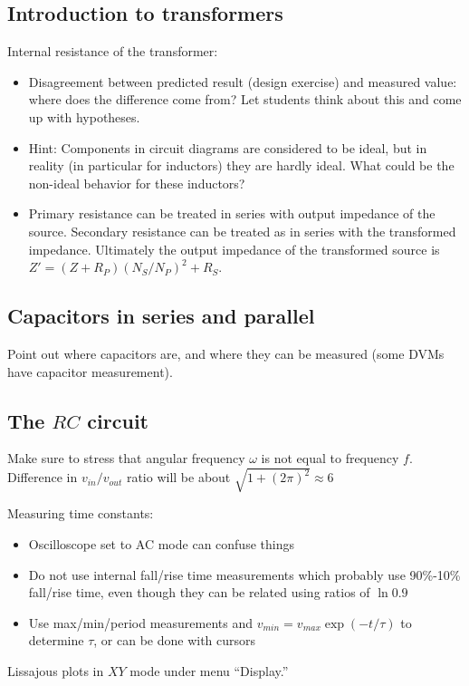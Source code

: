 \documentclass{article}
\begin{document}
\subsection{Introduction to transformers}
Internal resistance of the transformer:
\begin{itemize}
\item Disagreement between predicted result (design exercise) and measured value: where does the difference come from?  Let students think about this and come up with hypotheses.
\item Hint: Components in circuit diagrams are considered to be ideal, but in reality (in particular for inductors) they are hardly ideal.  What could be the non-ideal behavior for these inductors?
\item Primary resistance can be treated in series with output impedance of the source.  Secondary resistance can be treated as in series with the transformed impedance.  Ultimately the output impedance of the transformed source is $Z' = (Z + R_P) (N_S/N_P)^2 + R_S$.
\end{itemize}

\subsection{Capacitors in series and parallel}
Point out where capacitors are, and where they can be measured (some DVMs have capacitor measurement).

\subsection{The \boldmath$RC$ circuit}
Make sure to stress that angular frequency $\omega$ is not equal to frequency $f$.  Difference in $v_{in}/v_{out}$ ratio will be about $\sqrt{1 + (2\pi)^2} \approx 6$

Measuring time constants:
\begin{itemize}
\item Oscilloscope set to AC mode can confuse things
\item Do not use internal fall/rise time measurements which probably use 90\%-10\% fall/rise time, even though they can be related using ratios of $\ln 0.9$
\item Use max/min/period measurements and $v_{min} = v_{max} \exp (-t/\tau)$ to determine $\tau$, or can be done with cursors
\end{itemize}

Lissajous plots in $XY$ mode under menu ``Display.''
\end{document}
